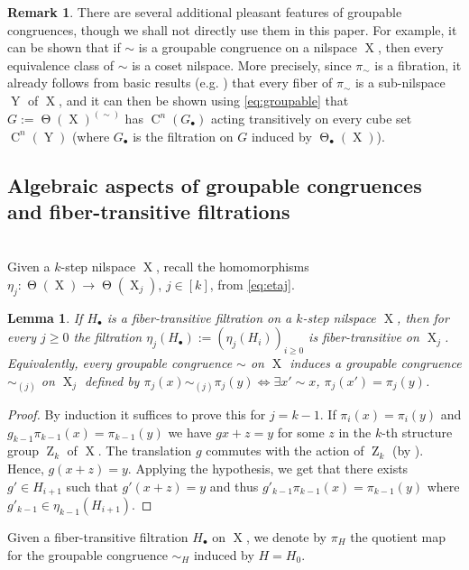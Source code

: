 \documentclass[a4paper,12pt,reqno]{amsart}
\newtheorem{lemma}[theorem]{Lemma}
\theoremstyle{definition}
\newtheorem{remark}[theorem]{Remark}
\def\to{\rightarrow}
\DeclareMathOperator{\ab}{Z}
\DeclareMathOperator{\tran}{\Theta}
\DeclareMathOperator{\ns}{X}
\DeclareMathOperator{\nss}{Y}
\DeclareMathOperator{\cu}{C}
\begin{document}
\begin{remark}\label{rem:addgpcongprops}
There are several additional pleasant features of groupable congruences, though we shall not directly use them in this paper. For example, it can be shown that if $\sim$ is a groupable congruence on a nilspace $\ns$, then every equivalence class of $\sim$ is a coset nilspace. More precisely, since $\pi_{\sim}$ is a fibration, it already follows from basic results (e.g. \cite[Lemma 3.2]{CGSS}) that every fiber of $\pi_{\sim}$ is a sub-nilspace  $\nss$ of $\ns$, and it can then be shown using \eqref{eq:groupable} that $G:=\tran(\ns)^{(\sim)}$ has $\cu^n(G_\bullet)$ acting transitively on every cube set $\cu^n(\nss)$ (where $G_\bullet$ is the filtration on $G$ induced by $\tran_\bullet(\ns)$). 
\end{remark}



\subsection{Algebraic aspects of groupable congruences and fiber-transitive filtrations}\hfill\smallskip\\
Given a $k$-step nilspace $\ns$, recall the homomorphisms $\eta_j:\tran(\ns)\to\tran(\ns_j)$, $j\in [k]$, from \eqref{eq:etaj}.
\begin{lemma}\label{lem:group-cong-to-factors}
If $H_\bullet$ is a fiber-transitive filtration on a $k$-step nilspace $\ns$, then for every $j\ge 0$ the filtration $\eta_j(H_\bullet):=(\eta_j(H_i))_{i\ge 0}$ is fiber-transitive on $\ns_j$. Equivalently, every groupable congruence $\sim$ on $\ns$ induces a groupable congruence $\sim_{(j)}$ on $\ns_j$ defined by $\pi_j(x)\sim_{(j)}\pi_j(y) \Leftrightarrow \exists x'\sim x$, $\pi_j(x')=\pi_j(y)$.
\end{lemma}
\begin{proof}
By induction it suffices to prove this for $j=k-1$. If $\pi_i(x)=\pi_i(y)$ and $g_{k-1}\pi_{k-1}(x)=\pi_{k-1}(y)$ we have $gx+z=y$ for some $z$ in the $k$-th structure group $\ab_k$ of $\ns$. The translation $g$ commutes with the action of $\ab_k$ (by \cite[Lemma 3.2.37]{Cand:Notes1}). Hence, $g(x+z)=y$. Applying the hypothesis,  we get that there exists $g'\in H_{i+1}$ such that $g'(x+z)=y$ and thus $g'_{k-1}\pi_{k-1}(x)=\pi_{k-1}(y)$ where $g'_{k-1}\in \eta_{k-1}(H_{i+1})$. 
\end{proof}
\noindent Given a fiber-transitive filtration $H_\bullet$ on $\ns$, we denote by $\pi_H$ the quotient map for the groupable congruence $\sim_H$ induced by $H=H_0$.
\end{document}
